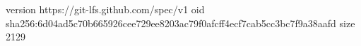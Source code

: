 version https://git-lfs.github.com/spec/v1
oid sha256:6d04ad5c70b665926cee729ee8203ac79f0afcff4ecf7cab5cc3bc7f9a38aafd
size 2129
